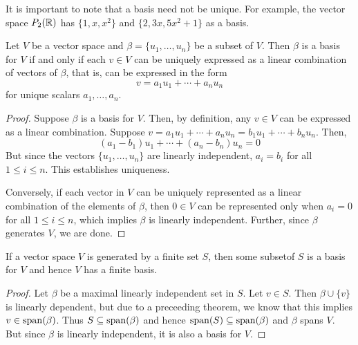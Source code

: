 It is important to note that a basis need not be unique. For example, the vector space $P_2(\mathbb{R})$ has $\{1,x,x^2\}$ and $\{2,3x,5x^2 + 1\}$ as a basis.

\begin{theorem}
    Let $V$ be a vector space and $\beta = \{u_1,\ldots,u_n\}$ be a subset of $V$. Then $\beta$ is a basis for $V$ if and only if each $v\in V$ can be uniquely expressed as a linear combination of vectors of $\beta$, that is, can be expressed in the form 
    \begin{equation*}
        v = a_1u_1 + \cdots + a_nu_n
    \end{equation*}
    for unique scalars $a_1,\ldots,a_n$.
\end{theorem}
\begin{proof}
    Suppose $\beta$ is a basis for $V$. Then, by definition, any $v\in V$ can be expressed as a linear combination. Suppose $v = a_1u_1 + \cdots + a_nu_n = b_1u_1 + \cdots + b_nu_n$. Then, 
    \begin{equation*}
        (a_1 - b_1)u_1 + \cdots + (a_n - b_n)u_n = 0
    \end{equation*}
    But since the vectors $\{u_1,\ldots,u_n\}$ are linearly independent, $a_i = b_i$ for all $1\le i\le n$. This establishes uniqueness.

    Conversely, if each vector in $V$ can be uniquely represented as a linear combination of the elements of $\beta$, then $0\in V$ can be represented only when $a_i = 0$ for all $1\le i\le n$, which implies $\beta$ is linearly independent. Further, since $\beta$ generates $V$, we are done.
\end{proof}

\begin{theorem}
    If a vector space $V$ is generated by a finite set $S$, then some subsetof $S$ is a basis for $V$ and hence $V$ has a finite basis.
\end{theorem}
\begin{proof}
    Let $\beta$ be a maximal linearly independent set in $S$. Let $v\in S$. Then $\beta\cup\{v\}$ is linearly dependent, but due to a preceeding theorem, we know that this implies $v\in\operatorname{span}(\beta)$. Thus $S\subseteq\operatorname{span}(\beta)$ and hence $\operatorname{span}(S)\subseteq\operatorname{span}(\beta)$ and $\beta$ spans $V$. But since $\beta$ is linearly independent, it is also a basis for $V$.
\end{proof}

